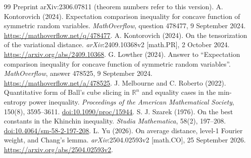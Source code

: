 \documentclass[11pt,a4paper]{article}
\numberwithin{equation}{section}
\theoremstyle{remark}
\newcommand{\R}{\mathbb R}
\begin{document}
\begin{thebibliography}{99}
Preprint arXiv:2306.07811 (theorem numbers refer to this version).
A. Kontorovich (2024). Expectation comparison inequality for concave
function of symmetric random variables. \emph{MathOverflow}, question
478477, 9 September 2024. \url{https://mathoverflow.net/q/478477}.
A. Kontorovich (2024). On the tensorization of the variational distance.
\emph{arXiv}:2409.10368v2 [math.PR], 2 October 2024.
\url{https://arxiv.org/abs/2409.10368}.
G. Lowther (2024). Answer to ``Expectation comparison inequality for concave
function of symmetric random variables''. \emph{MathOverflow}, answer
478525, 9 September 2024. \url{https://mathoverflow.net/a/478525}.
J. Melbourne and C. Roberto (2022). Quantitative form of Ball's cube slicing
in $\R^n$ and equality cases in the min-entropy power inequality.
\emph{Proceedings of the American Mathematical Society}, 150(8), 3595--3611.
\href{https://doi.org/10.1090/proc/15944}{doi:10.1090/proc/15944}.
S. J. Szarek (1976). On the best constants in the Khinchin inequality.
\emph{Studia Mathematica}, 58(2), 197--208.
\href{https://doi.org/10.4064/sm-58-2-197-208}{doi:10.4064/sm-58-2-197-208}.
L. Yu (2026). On average distance, level-1 Fourier weight, and Chang's
lemma. \emph{arXiv}:2504.02593v2 [math.CO], 25 September 2026.
\url{https://arxiv.org/abs/2504.02593v2}.
\end{thebibliography}
\end{document}
